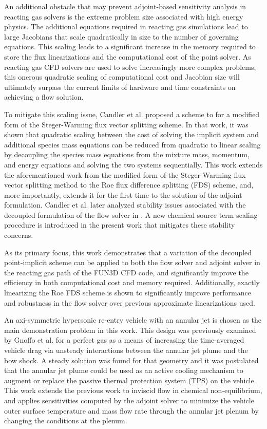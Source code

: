 An additional obstacle that may prevent adjoint-based sensitivity analysis in
reacting gas solvers is the extreme problem size associated with high energy
physics.  The additional equations required in reacting gas simulations lead to
large Jacobians that scale quadratically in size to the number of governing
equations.  This scaling leads to a significant increase in the memory required
to store the flux linearizations and the computational cost of the point solver.
As reacting gas CFD solvers are used to solve increasingly more complex
problems, this onerous quadratic scaling of computational cost and Jacobian size
will ultimately surpass the current limits of hardware and time constraints on
achieving a flow solution\cite{fischer}.

To mitigate this scaling issue, Candler et al.\cite{candler} proposed a scheme
to for a modified form of the Steger-Warming flux vector splitting
scheme\cite{MacCormack,Steger}. In that work, it was shown that quadratic
scaling between the cost of solving the implicit system and additional species
mass equations can be reduced from quadratic to linear scaling by decoupling the
species mass equations from the mixture mass, momentum, and energy equations and
solving the two systems sequentially.  This work extends the aforementioned work
from the modified form of the Steger-Warming flux vector splitting method to the
Roe flux difference splitting (FDS) scheme, and, more importantly, extends it
for the first time to the solution of the adjoint formulation.  Candler et
al.\cite{candler2013analysis} later analyzed stability issues associated with
the decoupled formulation of the flow solver in \cite{candler}.  A new chemical
source term scaling procedure is introduced in the present work that mitigates
these stability concerns.

As its primary focus, this work demonstrates that a variation of the decoupled
point-implicit scheme can be applied to both the flow solver and adjoint solver
in the reacting gas path of the FUN3D CFD code\cite{biedron2016fun3d}, and
significantly improve the efficiency in both computational cost and memory
required.  Additionally, exactly linearizing the Roe FDS scheme is shown to
significantly improve performance and robustness in the flow solver over
previous approximate linearizations used\cite{gnoffo-tp}.

An axi-symmetric hypersonic re-entry vehicle with an annular jet is chosen as
the main demonstration problem in this work.  This design was previously
examined by Gnoffo et al.\cite{gnoffo2016tapping} for a perfect gas as a means
of increasing the time-averaged vehicle drag via unsteady interactions between
the annular jet plume and the bow shock.  A steady solution was found for that
geometry and it was postulated that the annular jet plume could be used as an
active cooling mechanism to augment or replace the passive thermal protection
system (TPS) on the vehicle.  This work extends the previous work to inviscid
flow in chemical non-equilibrium, and applies sensitivities computed by the
adjoint solver to minimize the vehicle outer surface temperature and mass flow
rate through the annular jet plenum by changing the conditions at the plenum.

